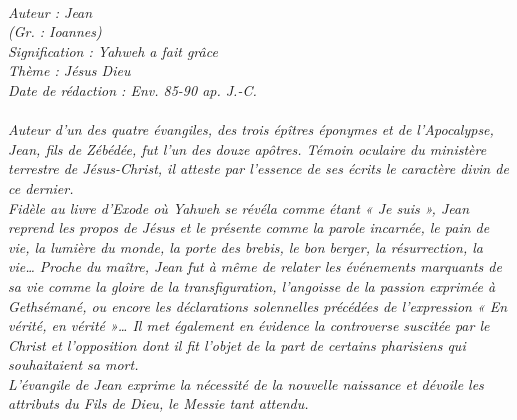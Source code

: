 \BFont
\noindent\hrulefill
{\footnotesize
\textit{
\bigskip
{\centering{}
\\Auteur : Jean
\\(Gr. : Ioannes)
\\Signification : Yahweh a fait grâce
\\Thème : Jésus Dieu
\\Date de rédaction : Env. 85-90 ap. J.-C.\\}
}
\textit{
\\Auteur d'un des quatre évangiles, des trois épîtres éponymes et de l'Apocalypse, Jean, fils de Zébédée, fut l'un des douze apôtres. Témoin oculaire du ministère terrestre de Jésus-Christ, il atteste par l'essence de ses écrits le caractère divin de ce dernier.
\\Fidèle au livre d'Exode où Yahweh se révéla comme étant « Je suis », Jean reprend les propos de Jésus et le présente comme la parole incarnée, le pain de vie, la lumière du monde, la porte des brebis, le bon berger, la résurrection, la vie… Proche du maître, Jean fut à même de relater les événements marquants de sa vie comme la gloire de la transfiguration, l'angoisse de la passion exprimée à Gethsémané, ou encore les déclarations solennelles précédées de l'expression « En vérité, en vérité »… Il met également en évidence la controverse suscitée par le Christ et l'opposition dont il fit l'objet de la part de certains pharisiens qui souhaitaient sa mort.
\\L'évangile de Jean exprime la nécessité de la nouvelle naissance et dévoile les attributs du Fils de Dieu, le Messie tant
attendu.\bigskip
}
}
\par\nobreak\noindent\hrulefill
